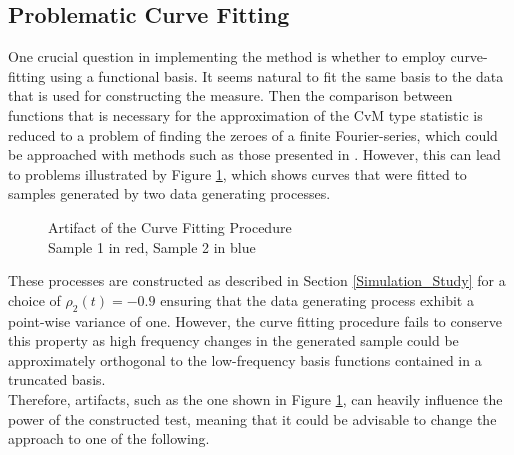 \documentclass[12pt, a4paper]{article}
\theoremstyle{MAstyle} \newtheorem{assumption}{Assumption}[section]
\theoremstyle{MAstyle} \newtheorem{definition}{Definition}[section]
\theoremstyle{MAstyle} \newtheorem{theorem}{Theorem}[section]
\begin{document}
		\subsection{Problematic Curve Fitting}\label{problem_curve_fitting}
			One crucial question in implementing the method is whether to employ curve-fitting using a functional basis. It seems natural to fit the same basis to the data that is used for constructing the measure. Then the comparison between functions that is necessary for the approximation of the CvM type statistic is reduced to a problem of finding the zeroes of a finite Fourier-series, which could be approached with methods such as those presented in \cite{boyd_computing_2006}. 
			However, this can lead to problems illustrated by Figure \ref{curve_fitting_artefacts}, which shows curves that were fitted to samples generated by two data generating processes.	
			\begin{figure}[H]
				\caption{Artifact of the Curve Fitting Procedure \\
				Sample 1 in red, Sample 2 in blue}
				\label{curve_fitting_artefacts}
			\end{figure}
			These processes are constructed as described in Section \ref{Simulation_Study} for a choice of $\rho_2(t) = -0.9$ ensuring that the data generating process exhibit a point-wise variance of one. However, the curve fitting procedure fails to conserve this property as high frequency changes in the generated sample could be approximately orthogonal to the low-frequency basis functions contained in a truncated basis.\\
			
			Therefore, artifacts, such as the one shown in Figure \ref{curve_fitting_artefacts}, can heavily influence the power of the constructed test, meaning that it could be advisable to change the approach to one of the following.
			
\end{document}
